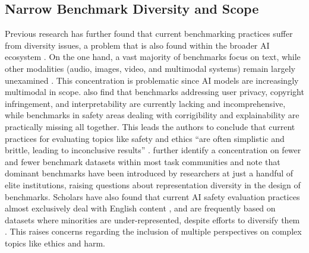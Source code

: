 

\subsection{Narrow Benchmark Diversity and Scope}

Previous research has further found that current benchmarking practices suffer from diversity issues, a problem that is also found within the broader AI ecosystem  \cite{gomez2024}. On the one hand, a vast majority of benchmarks focus on text, while other modalities (audio, images, video, and multimodal systems) remain largely unexamined \cite{rauh2024, weidinger_sociotechnical_2023, rottger2024}. This concentration is problematic since AI models are increasingly multimodal in scope. \citet{guldimann2024} also find that benchmarks addressing user privacy, copyright infringement, and interpretability are currently lacking and incomprehensive, while benchmarks in safety areas dealing with corrigibility and explainability are practically missing all together. This leads the authors to conclude that current practices for evaluating topics like safety and ethics “are often simplistic and brittle, leading to inconclusive results” \cite[p.~3]{guldimann2024}.
\citet{koch2021} further identify a concentration on fewer and fewer benchmark datasets within most task communities and note that dominant benchmarks have been introduced by researchers at just a handful of elite institutions, raising questions about representation diversity in the design of benchmarks. Scholars have also found that current AI safety evaluation practices almost exclusively deal with English content \cite{mcintosh2024, rottger2024}, and are frequently based on datasets where minorities are under-represented, despite efforts to diversify them \cite{simson2024}. This raises concerns regarding the inclusion of multiple perspectives on complex topics like ethics and harm. 

